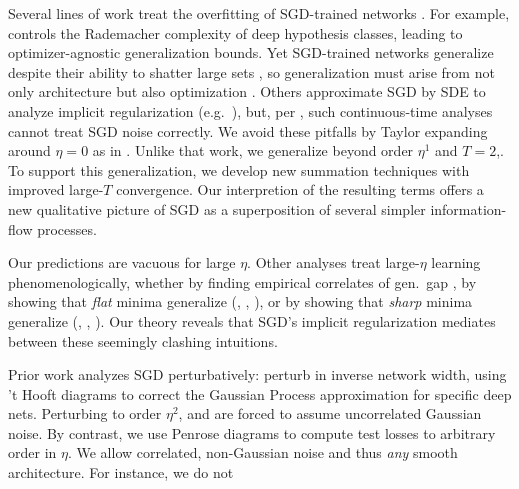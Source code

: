 \documentclass[final,12pt]{colt2021} %
\begin{document}
        
            Several lines of work treat the overfitting of SGD-trained networks
            \citep{ne17a}.  For example, \cite{ba17} controls the Rademacher
            complexity of deep hypothesis classes, leading to
            optimizer-agnostic generalization bounds.  Yet SGD-trained networks
            generalize despite their ability to shatter large sets
            \citep{zh17}, so generalization must arise from not only
            architecture but also optimization \citep{ne17b}.  Others
            approximate SGD by SDE to analyze implicit regularization (e.g.\
            \cite{ch18}), but, per \cite{ya19a}, such continuous-time analyses
            cannot treat SGD noise correctly.
            We avoid these pitfalls by Taylor expanding around $\eta=0$ as in
            \cite{ro18}.  Unlike that work, we generalize beyond order $\eta^1$
            and $T=2$,.  To support this generalization, we develop new 
            summation techniques with improved large-$T$ convergence.  Our
            interpretion of the resulting terms offers a new qualitative
            picture of SGD as a superposition of several simpler
            information-flow processes.
            
        
            Our predictions are vacuous for large $\eta$.  Other analyses treat
            large-$\eta$ learning phenomenologically, whether by finding
            empirical correlates of gen.\ gap \citep{li18}, by showing that
            \emph{flat} minima generalize (\cite{ho17}, \cite{ke17},
            \cite{wa18}), or by showing that \emph{sharp} minima generalize
            (\cite{st56}, \cite{di17}, \cite{wu18}).  Our theory reveals that 
            SGD's implicit regularization mediates between these seemingly
            clashing intuitions.
            
        
            Prior work analyzes SGD perturbatively: \cite{dy19} perturb in
            inverse network width, using 't Hooft diagrams to correct the
            Gaussian Process approximation for specific deep nets.  Perturbing
            to order $\eta^2$, \cite{ch18} and \cite{li17} are forced to assume
            uncorrelated Gaussian noise.  By contrast, we use Penrose diagrams
            to compute test losses to arbitrary order in $\eta$.  We allow
            correlated, non-Gaussian noise and thus \emph{any} smooth
            architecture.  For instance, we do not
    
\end{document}

